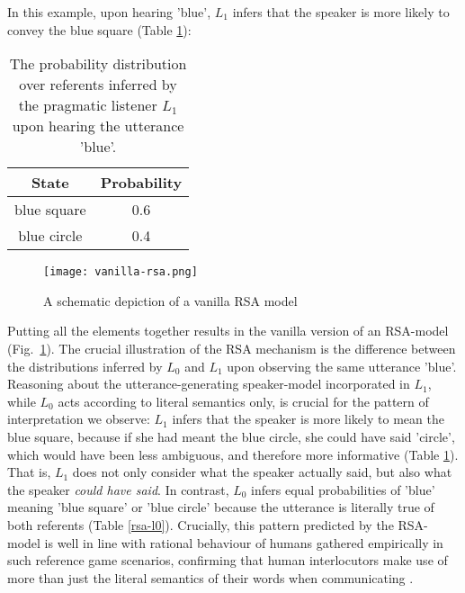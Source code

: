 In this example, upon hearing 'blue', $L_1$ infers that the speaker is more likely to convey the blue square (Table \ref{rsa-l1}):

\begin{table}[h]
	\begin{center}
		\caption{The probability distribution over referents inferred by the pragmatic listener $L_1$ upon hearing the utterance 'blue'.}
		\label{rsa-l1}
		\vskip 0.12in
		\begin{tabular}{cc}
			State & Probability \\
			\hline
			blue square & 0.6 \\
			blue circle & 0.4
		\end{tabular}
	\end{center}
\end{table}
\begin{figure*}[t]
	\begin{center}
		\texttt{[image: vanilla-rsa.png]}
	\end{center}
	\vspace{-0.3cm}
	\caption{A schematic depiction of a vanilla RSA model \parencite{problang}}
	\label{vanilla-rsa}
\end{figure*}
Putting all the elements together results in the vanilla version of an RSA-model (Fig.~\ref{vanilla-rsa}).
The crucial illustration of the RSA mechanism is the difference between the distributions inferred by $L_0$ and $L_1$ upon observing the same utterance 'blue'. Reasoning about the utterance-generating speaker-model incorporated in $L_1$, while $L_0$ acts according to literal semantics only, is crucial for the pattern of interpretation we observe: $L_1$ infers that the speaker is more likely to mean the blue square, because if she had meant the blue circle, she could have said 'circle', which would have been less ambiguous, and therefore more informative (Table \ref{rsa-l1}). That is, $L_1$ does not only consider what the speaker actually said, but also what the speaker \emph{could have said}. In contrast, $L_0$ infers equal probabilities of 'blue' meaning 'blue square' or 'blue circle' because the utterance is literally true of both referents (Table \ref{rsa-l0}). Crucially, this pattern predicted by the RSA-model is well in line with rational behaviour of humans gathered empirically in such reference game scenarios, confirming that human interlocutors make use of more than just the literal semantics of their words when communicating \parencite{frank2012predicting, problang}.

